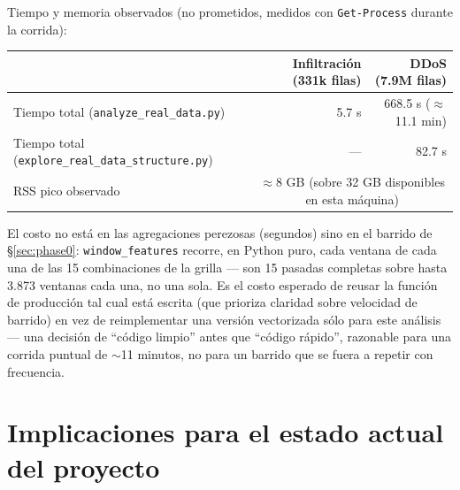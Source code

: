 \documentclass[11pt]{article}
\newcommand{\code}[1]{\texttt{\small #1}}
\begin{document}
Tiempo y memoria observados (no prometidos, medidos con \code{Get-Process} durante la
corrida):

\begin{center}
\begin{tabular}{@{}lrr@{}}
\toprule
& \textbf{Infiltración (331k filas)} & \textbf{DDoS (7.9M filas)} \\
\midrule
Tiempo total (\code{analyze\_real\_data.py}) & 5.7 s & 668.5 s ($\approx$11.1 min) \\
Tiempo total (\code{explore\_real\_data\_structure.py}) & --- & 82.7 s \\
RSS pico observado & \multicolumn{2}{c}{$\approx$8 GB (sobre 32 GB disponibles en esta máquina)} \\
\bottomrule
\end{tabular}
\end{center}

El costo no está en las agregaciones perezosas (segundos) sino en el barrido de
\S\ref{sec:phase0}: \code{window\_features} recorre, en Python puro, cada ventana de cada
una de las 15 combinaciones de la grilla --- son 15 pasadas completas sobre hasta 3.873
ventanas cada una, no una sola. Es el costo esperado de reusar la función de producción
tal cual está escrita (que prioriza claridad sobre velocidad de barrido) en vez de
reimplementar una versión vectorizada sólo para este análisis --- una decisión de
``código limpio'' antes que ``código rápido'', razonable para una corrida puntual de
$\sim$11 minutos, no para un barrido que se fuera a repetir con frecuencia.

\section{Implicaciones para el estado actual del proyecto}
\end{document}
